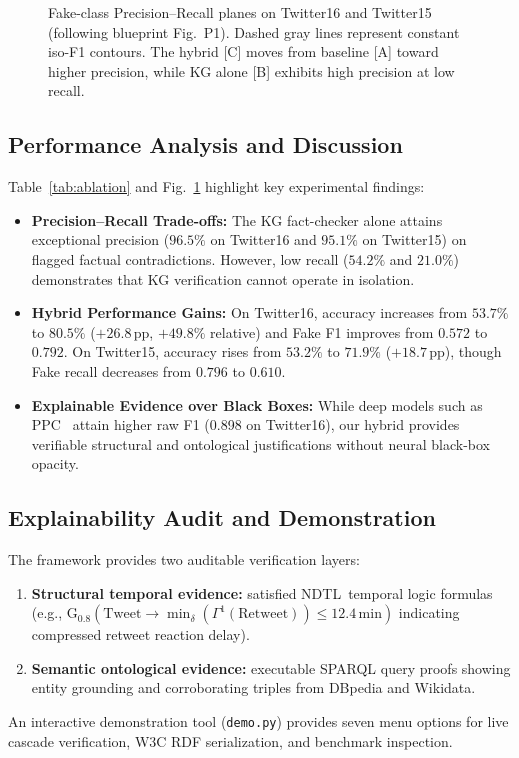 \documentclass[10pt,twocolumn,a4paper]{article}
\newcommand{\NDTL}{\textsc{NDTL}}
\begin{document}
\begin{figure}[t]
\caption{Fake-class Precision--Recall planes on Twitter16 and Twitter15 (following blueprint Fig.~P1). Dashed gray lines represent constant iso-F1 contours. The hybrid [C] moves from baseline [A] toward higher precision, while KG alone [B] exhibits high precision at low recall.}
\label{fig:pr_plane}
\end{figure}
 
\subsection{Performance Analysis and Discussion}
Table~\ref{tab:ablation} and Fig.~\ref{fig:pr_plane} highlight key experimental findings:
\begin{itemize}
  \item \textbf{Precision--Recall Trade-offs:} The KG fact-checker alone attains exceptional precision ($96.5\%$ on Twitter16 and $95.1\%$ on Twitter15) on flagged factual contradictions. However, low recall ($54.2\%$ and $21.0\%$) demonstrates that KG verification cannot operate in isolation.
  \item \textbf{Hybrid Performance Gains:} On Twitter16, accuracy increases from $53.7\%$ to $80.5\%$ ($+26.8\,\mathrm{pp}$, $+49.8\%$ relative) and Fake F1 improves from $0.572$ to $0.792$. On Twitter15, accuracy rises from $53.2\%$ to $71.9\%$ ($+18.7\,\mathrm{pp}$), though Fake recall decreases from $0.796$ to $0.610$.
  \item \textbf{Explainable Evidence over Black Boxes:} While deep models such as PPC~\cite{liu2018ppc} attain higher raw F1 (0.898 on Twitter16), our hybrid provides verifiable structural and ontological justifications without neural black-box opacity.
\end{itemize}
 
\subsection{Explainability Audit and Demonstration}
The framework provides two auditable verification layers:
\begin{enumerate}
  \item \textbf{Structural temporal evidence:} satisfied \NDTL\ temporal logic formulas (e.g., $\mathrm{G}_{0.8}(\mathrm{Tweet}\to\min_{\delta}(\Gamma^1(\mathrm{Retweet}))\le 12.4\,\mathrm{min})$ indicating compressed retweet reaction delay).
  \item \textbf{Semantic ontological evidence:} executable SPARQL query proofs showing entity grounding and corroborating triples from DBpedia and Wikidata.
\end{enumerate}
An interactive demonstration tool (\texttt{demo.py}) provides seven menu options for live cascade verification, W3C RDF serialization, and benchmark inspection.
 
\end{document}
